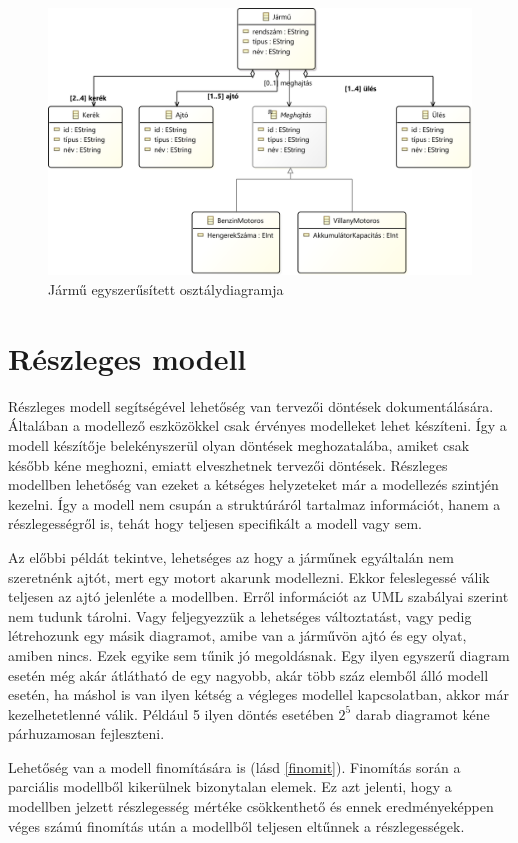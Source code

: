 \begin{figure}[!ht]
	\centering
	\includegraphics[width=130mm]{figures/vehicle.pdf}
	\caption{Jármű egyszerűsített osztálydiagramja} 
	\label{jarmu}
\end{figure}

\section{Részleges modell}
Részleges modell segítségével lehetőség van tervezői döntések dokumentálására. Általában a modellező eszközökkel csak érvényes modelleket lehet készíteni. Így a modell készítője belekényszerül olyan döntések meghozatalába, amiket csak később kéne meghozni, emiatt elveszhetnek tervezői döntések. Részleges modellben lehetőség van ezeket a kétséges helyzeteket már a modellezés szintjén kezelni. Így a modell nem csupán a struktúráról tartalmaz információt, hanem a részlegességről is, tehát hogy teljesen specifikált a modell vagy sem. 
\par
Az előbbi példát tekintve, lehetséges az hogy a járműnek egyáltalán nem szeretnénk ajtót, mert egy motort akarunk modellezni. Ekkor feleslegessé válik teljesen az ajtó jelenléte a modellben. Erről információt az UML szabályai szerint nem tudunk tárolni. Vagy feljegyezzük a lehetséges változtatást, vagy pedig létrehozunk egy másik diagramot, amibe van a járművön ajtó és egy olyat, amiben nincs. Ezek egyike sem tűnik jó megoldásnak. Egy ilyen egyszerű diagram esetén még akár átlátható de egy nagyobb, akár több száz elemből álló modell esetén, ha máshol is van ilyen kétség a végleges modellel kapcsolatban, akkor már kezelhetetlenné válik. Például 5 ilyen döntés esetében $2^{5}$ darab diagramot kéne párhuzamosan fejleszteni.
\par
Lehetőség van a modell finomítására is (lásd \autoref{finomit}). Finomítás során a parciális modellből kikerülnek bizonytalan elemek. Ez azt jelenti, hogy a modellben jelzett részlegesség mértéke csökkenthető és ennek eredményeképpen véges számú finomítás után a modellből teljesen eltűnnek a részlegességek.

